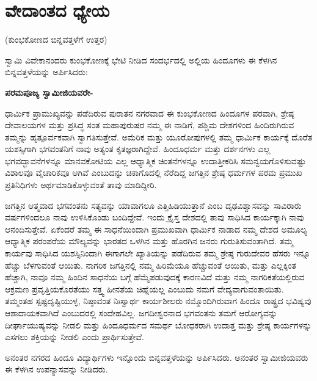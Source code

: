
\chapter{ವೇದಾಂತದ ಧ್ಯೇಯ}

\begin{center}
(ಕುಂಭಕೋಣದ ಬಿನ್ನವತ್ತಳೆಗೆ ಉತ್ತರ)
\end{center}

ಸ್ವಾಮಿ ವಿವೇಕಾನಂದರು ಕುಂಭಕೋಣಕ್ಕೆ ಭೇಟಿ ನೀಡಿದ ಸಂದರ್ಭದಲ್ಲಿ ಅಲ್ಲಿಯ ಹಿಂದೂಗಳು ಈ ಕೆಳಗಿನ ಬಿನ್ನವತ್ತಳೆಯನ್ನು ಅರ್ಪಿಸಿದರು:

\textbf{ಪರಮಪೂಜ್ಯ ಸ್ವಾಮೀಜಿಯವರೇ-}

ಧಾರ್ಮಿಕ ಪ್ರಾಮುಖ್ಯವನ್ನು ಪಡೆದಿರುವ ಪುರಾತನ ನಗರವಾದ ಈ ಕುಂಭಕೋಣದ ಹಿಂದೂಗಳ ಪರವಾಗಿ, ಶ್ರೇಷ್ಠ ದೇವಾಲಯಗಳ ಮತ್ತು ಪ್ರಸಿದ್ಧ ಸಂತ ಮಹಾಪುರುಷರ ನಮ್ಮ ಈ ನಾಡಿಗೆ, ಪಶ್ಚಿಮ ದೇಶಗಳಿಂದ ಹಿಂದಿರುಗಿರುವ ತಮ್ಮನ್ನು ಹೃತ್ಪೂರ್ವಕವಾಗಿ ಸ್ವಾಗತಿಸುತ್ತೇವೆ. ಅಮೆರಿಕ ಮತ್ತು ಯೂರೋಪುಗಳಲ್ಲಿ ತಮ್ಮ ಧಾರ್ಮಿಕ ಕಾರ್ಯಕ್ಕೆ ದೊರೆತ ಯಶಸ್ಸಿಗಾಗಿ ಭಗವಂತನಿಗೆ ನಾವು ಅತ್ಯಂತ ಕೃತಜ್ಞರಾಗಿದ್ದೇವೆ. ಹಿಂದೂಧರ್ಮ ಮತ್ತು ದರ್ಶನಗಳು ಎಲ್ಲ ಭಗವದ್ಭಾವನೆಗಳನ್ನೂ ಮಾನವಕೋಟಿಯ ಎಲ್ಲ ಆಧ್ಯಾತ್ಮಿಕ ಚಿಂತನೆಗಳನ್ನೂ ಉದಾತ್ತೀಕರಿಸಿ ಸಮನ್ವಯಗೊಳಿಸುವಷ್ಟು ವಿಶಾಲವೂ ವೈಚಾರಿಕವೂ ಆಗಿವೆ ಎಂಬುದನ್ನು ಚಿಕಾಗೊದಲ್ಲಿ ನೆರೆದಿದ್ದ ಜಗತ್ತಿನ ಶ್ರೇಷ್ಠ ಧರ್ಮಗಳ ಪರಮ ಪ್ರಮುಖ ಪ್ರತಿನಿಧಿಗಳು ಅರ್ಥಮಾಡಿಕೊಳ್ಳುವಂತೆ ತಾವು ಮಾಡಿದ್ದೀರಿ.

ಜಗತ್ತಿನ ಆತ್ಮವಾದ ಭಗವಂತನು ಸತ್ಯವನ್ನು ಯಾವಾಗಲೂ ಎತ್ತಿಹಿಡಿಯು\-ತ್ತಾನೆ ಎಂಬ ದೃಢವಿಶ್ವಾಸವನ್ನು ಸಾವಿರಾರು ವರ್ಷಗಳಿಂದಲೂ ನಾವು ಉಳಿಸಿಕೊಂಡು ಬಂದಿದ್ದೇವೆ. ಇಂದು ಕ್ರೈಸ್ತ ದೇಶದಲ್ಲಿ ತಾವು ಸಾಧಿಸಿದ ಕಾರ್ಯಕ್ಕಾಗಿ ನಾವು ಆನಂದಿಸುತ್ತೇವೆ. ಏಕೆಂದರೆ ತಮ್ಮ ಈ ಸಾಧನೆಯಿಂದಾಗಿ ಪ್ರಮುಖವಾಗಿ ಧಾರ್ಮಿಕ ನಾಡಾದ ನಮ್ಮ ದೇಶದ ಅಮೂಲ್ಯ ಆಧ್ಯಾತ್ಮಿಕ ಪರಂಪರೆಯ ಮೌಲ್ಯವನ್ನು ಭಾರತದ ಒಳಗಿನ ಮತ್ತು ಹೊರಗಿನ ಜನರು ಗುರುತಿಸುವಂತಾಗಿದೆ. ತಮ್ಮ ಕಾರ್ಯವು ಸಾಧಿಸಿದ ಯಶಸ್ಸಿನಿಂದಾಗಿ ಈಗಾಗಲೇ ಖ್ಯಾತಿಯನ್ನು ಪಡೆದಿರುವ ತಮ್ಮ ಶ್ರೇಷ್ಠ ಗುರುದೇವರ ಹೆಸರು ಇನ್ನೂ ಹೆಚ್ಚು ಬೆಳಗುವಂತೆ ಆಯಿತು. ನಾಗರಿಕ ಜಗತ್ತಿನಲ್ಲಿ ನಮ್ಮ ಹಿರಿಮೆಯೂ ಹೆಚ್ಚುವಂತೆ ಆಯಿತು, ಮತ್ತು ಎಲ್ಲಕ್ಕಿಂತ ಹೆಚ್ಚಾಗಿ, ನಾವೂ ನಮ್ಮ ಹಿಂದಿನ ಸಾಧನೆಯ ಬಗ್ಗೆ ಹೆಮ್ಮೆಪಡುವುದಕ್ಕೆ ಕಾರಣವಿದೆ ಮತ್ತು ನಮ್ಮ ನಾಗರಿಕತೆಯಲ್ಲಿರುವ ಆಕ್ರಮಣ ಪ್ರವೃತ್ತಿಯ\break ಕೊರತೆಯು ಸತ್ತ್ವ ಹೀನತೆಯ ಚಿಹ್ನೆಯಲ್ಲ ಎಂಬುದು ನಮಗೆ ವೇದ್ಯವಾಗು\-ವಂತಾಯಿತು. ತಮ್ಮಂತಹ ಸ್ಪಷ್ಟದೃಷ್ಟಿಯುಳ್ಳ, ನಿಷ್ಠಾವಂತ ನಿಃಸ್ವಾರ್ಥ ಕಾರ್ಯಶೀಲರು ನಮ್ಮೊಂದಿಗಿರುವಾಗ ಹಿಂದೂ ರಾಷ್ಟ್ರದ ಭವಿಷ್ಯವು ಆಶಾದಾಯಕವಾಗಿದೆ ಎಂಬುದರಲ್ಲಿ ಸಂದೇಹವಿಲ್ಲ. ಜಗದೀಶ್ವರನಾದ ಭಗವಂತನು ತಮಗೆ ಆರೋಗ್ಯವನ್ನು ದೀರ್ಘಾಯುಷ್ಯವನ್ನು ನೀಡಲಿ ಮತ್ತು ಹಿಂದೂಧರ್ಮದ ಸಮರ್ಥ ಬೋಧಕರಾಗಿ ಉದಾತ್ತ ಮತ್ತು ಶ್ರೇಷ್ಠ ಕಾರ್ಯಗಳನ್ನು ಎಸಗಲು ಶಕ್ತಿಯನ್ನು ನೀಡಲಿ ಎಂದು ಪ್ರಾರ್ಥಿಸುತ್ತೇವೆ.

ಅನಂತರ ನಗರದ ಹಿಂದೂ ವಿದ್ಯಾರ್ಥಿಗಳು ಇನ್ನೊಂದು ಬಿನ್ನವತ್ತಳೆಯನ್ನು ಅರ್ಪಿಸಿದರು. ಅನಂತರ ಸ್ವಾಮೀಜಿಯವರು ಈ ಕೆಳಗಿನ ಉಪನ್ಯಾಸವನ್ನು ನೀಡಿದರು.

